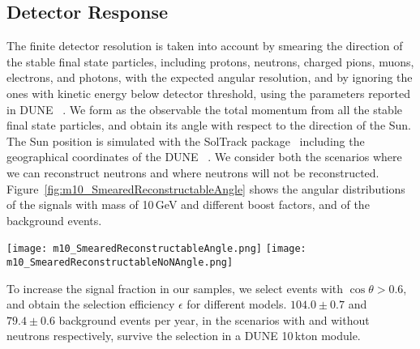 \subsection{Detector Response}
\label{sec:detector_resp}

The finite detector resolution is taken into
account by smearing the direction of the stable final state particles, 
including protons, neutrons, charged pions, muons, electrons, and photons,
with the expected angular resolution,
and by ignoring the ones with kinetic energy below detector threshold,
using the parameters reported in DUNE ~\cite{DUNE_CDR_V2}.
We form as the observable the total momentum from all the stable final state particles,
and obtain its angle with respect to the direction of the Sun.
The Sun position is simulated with the SolTrack package~\cite{SolTrack}
including the geographical coordinates of the DUNE ~\cite{DUNE_DocDB136}.
We consider both the scenarios where we can reconstruct neutrons and where
neutrons will not be reconstructed.
Figure~\ref{fig:m10_SmearedReconstructableAngle} shows the angular distributions of
the  signals with mass of 10\,GeV and different boost factors,
and of the background events.

\begin{figure*}[!htb]
\centering
\texttt{[image: m10\_SmearedReconstructableAngle.png]}
\texttt{[image: m10\_SmearedReconstructableNoNAngle.png]}
\caption[Angular distribution of the  signal events with the  mass of 10\,GeV]{Angular distribution of the  signal events with the  mass of 10\,GeV
and different boosted factors, $\gamma$, and of the atmospheric neutrino NC
background events.
$\theta$ represents the angle of the sum over all the stable final state
particles as detailed in the text.
The amount of background represents one-year data collection, magnified by a factor 100,
while the amount of signal reflects the detection efficiency of 10,000 MC events, as
described in this note.
The left plot shows the scenario where neutrons can be reconstructed,
while the right plot represents the scenario without neutrons.}
\label{fig:m10_SmearedReconstructableAngle}
\end{figure*}


To increase the signal fraction in our samples, we select events with $\cos\theta > 0.6$,
and obtain the selection efficiency $\epsilon$ for different  models.
$104.0 \pm 0.7$ and $79.4 \pm 0.6$ background events per year, in the scenarios with and without neutrons respectively,
survive the selection in a DUNE 10\,kton module.

